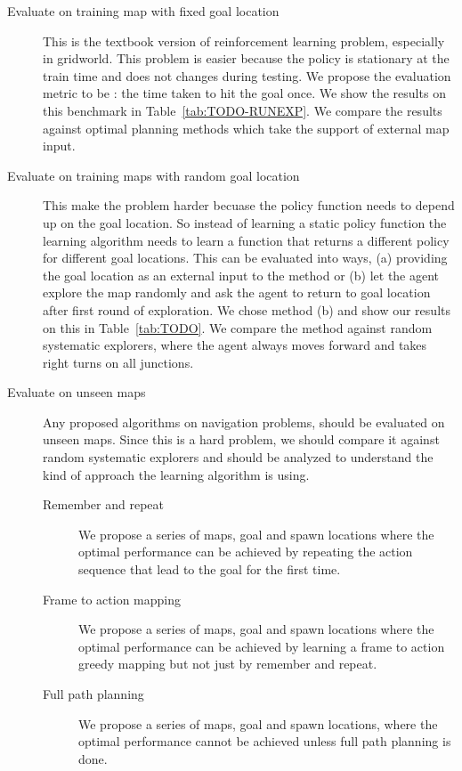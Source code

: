 \begin{description}
  \item[Evaluate on training map with fixed goal location]
    This is the textbook version of reinforcement learning problem,
    especially in gridworld. This problem is easier because the policy
    is stationary at the train time and does not changes during
    testing.
    We propose the evaluation metric to be : the time taken to hit the goal once. We show the results on this benchmark in Table~\ref{tab:TODO-RUNEXP}.
    We compare the results against optimal planning methods which take the support of external map input.
  \item [Evaluate on training maps with random goal location]
    This make the problem harder becuase the policy function needs to depend up on the goal location.
    So instead of learning a static policy function the learning algorithm needs to learn a function that returns a different policy for different goal locations.
    This can be evaluated into ways, (a) providing the goal location as an external input to the method or (b) let the agent explore the map randomly and ask the agent to return to goal location after first round of exploration.
    We chose method (b) and show our results on this in Table~\ref{tab:TODO}.
    We compare the method against random systematic explorers, where the agent always moves forward and takes right turns on all junctions.
  \item [Evaluate on unseen maps]
    Any proposed algorithms on navigation problems, should be evaluated on unseen maps.
    Since this is a hard problem, we should compare it against random systematic explorers and should be analyzed to understand the kind of approach the learning algorithm is using.
    \begin{description}
      \item[Remember and repeat]
        We propose a series of maps, goal and spawn locations where the optimal performance can be achieved by repeating the action sequence that lead to the goal for the first time.
      \item[Frame to action mapping]
        We propose a series of maps, goal and spawn locations where the optimal performance can be achieved by learning a frame to action greedy mapping but not just by remember and repeat.
      \item[Full path planning]
        We propose a series of maps, goal and spawn locations, where the optimal performance cannot be achieved unless full path planning is done.
    \end{description}
\end{description}

